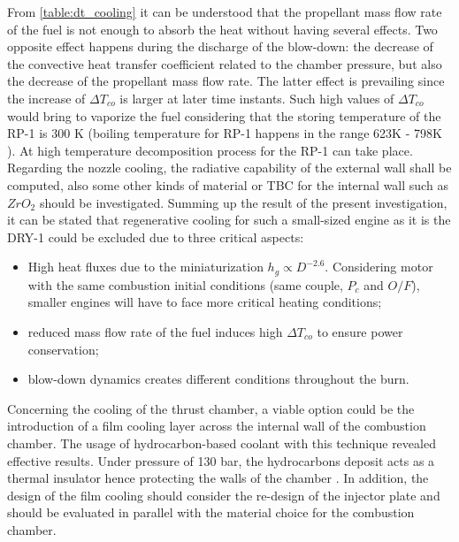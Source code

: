 From \autoref{table:dt_cooling} it can be understood that the propellant mass flow rate of the fuel is not enough to absorb the heat without having several effects. Two opposite effect happens during the discharge of the blow-down: the decrease of the convective heat transfer coefficient related to the chamber pressure, but also the decrease of the propellant mass flow rate. The latter effect is prevailing since the increase of $\Delta T_{co}$ is larger at later time instants. Such high values of $\Delta T_{co}$ would bring to vaporize the fuel considering that the storing temperature of the RP-1 is 300 K (boiling temperature for RP-1 happens in the range 623K - 798K \cite{rp_1_temp}). At high temperature decomposition process for the RP-1 can take place. Regarding the nozzle cooling, the radiative capability of the external wall shall be computed, also some other kinds of material or TBC for the internal wall such as $ZrO_2$  should be investigated. Summing up the result of the present investigation, it can be stated that regenerative cooling for such a small-sized engine as it is the DRY-1 could be excluded due to three critical aspects:
\begin{itemize}
    \item High heat fluxes due to the miniaturization $h_g \propto D^{-2.6}$. Considering motor with the same combustion initial conditions (same couple, $P_c$ and $O/F$), smaller engines will have to face more critical heating conditions;
    \item reduced mass flow rate of the fuel induces high $\Delta T_{co}$ to ensure power conservation;
    \item blow-down dynamics creates different conditions throughout the burn.
\end{itemize}

Concerning the cooling of the thrust chamber, a viable option could be the introduction of a film cooling layer across the internal wall of the combustion chamber. The usage of hydrocarbon-based coolant with this technique revealed effective results. Under pressure of 130 bar, the hydrocarbons deposit acts as a thermal insulator hence protecting the walls of the chamber \cite{huzel_huang}. In addition, the design of the film cooling should consider the re-design of the injector plate and should be evaluated in parallel with the material choice for the combustion chamber.